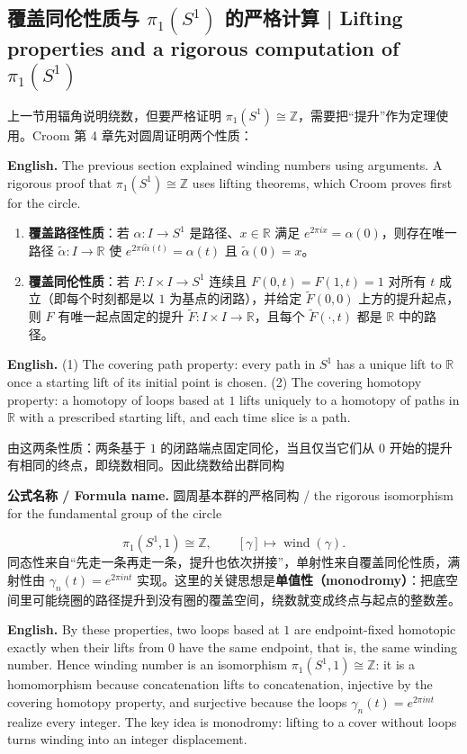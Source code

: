 \documentclass[UTF8,11pt,a4paper]{ctexart}
\newcommand{\EN}[1]{\par\noindent\textbf{English.} #1\par}
\newcommand{\FORMULA}[2]{\par\noindent\textbf{公式名称 / Formula name.} #1 / #2\par}
\begin{document}
\subsection{覆盖同伦性质与 $\pi_1(S^1)$ 的严格计算 | Lifting properties and a rigorous computation of $\pi_1(S^1)$}
\noindent 上一节用辐角说明绕数，但要严格证明 $\pi_1(S^1)\cong\mathbb Z$，需要把“提升”作为定理使用。Croom 第 4 章先对圆周证明两个性质：
\EN{The previous section explained winding numbers using arguments. A rigorous proof that $\pi_1(S^1)\cong\mathbb Z$ uses lifting theorems, which Croom proves first for the circle.}
\begin{enumerate}[label=(\arabic*)]
\item \textbf{覆盖路径性质}：若 $\alpha:I\to S^1$ 是路径、$x\in\mathbb R$ 满足 $e^{2\pi ix}=\alpha(0)$，则存在唯一路径 $\widetilde\alpha:I\to\mathbb R$ 使 $e^{2\pi i\widetilde\alpha(t)}=\alpha(t)$ 且 $\widetilde\alpha(0)=x$。
\item \textbf{覆盖同伦性质}：若 $F:I\times I\to S^1$ 连续且 $F(0,t)=F(1,t)=1$ 对所有 $t$ 成立（即每个时刻都是以 $1$ 为基点的闭路），并给定 $\widetilde F(0,0)$ 上方的提升起点，则 $F$ 有唯一起点固定的提升 $\widetilde F:I\times I\to\mathbb R$，且每个 $\widetilde F(\cdot,t)$ 都是 $\mathbb R$ 中的路径。
\end{enumerate}
\EN{(1) The covering path property: every path in $S^1$ has a unique lift to $\mathbb R$ once a starting lift of its initial point is chosen. (2) The covering homotopy property: a homotopy of loops based at $1$ lifts uniquely to a homotopy of paths in $\mathbb R$ with a prescribed starting lift, and each time slice is a path.}
\noindent 由这两条性质：两条基于 $1$ 的闭路端点固定同伦，当且仅当它们从 $0$ 开始的提升有相同的终点，即绕数相同。因此绕数给出群同构
\FORMULA{圆周基本群的严格同构}{the rigorous isomorphism for the fundamental group of the circle}
\[
\pi_1(S^1,1)\cong\mathbb Z,\qquad [\gamma]\mapsto\operatorname{wind}(\gamma).
\]
同态性来自“先走一条再走一条，提升也依次拼接”，单射性来自覆盖同伦性质，满射性由 $\gamma_n(t)=e^{2\pi int}$ 实现。这里的关键思想是\textbf{单值性（monodromy）}：把底空间里可能绕圈的路径提升到没有圈的覆盖空间，绕数就变成终点与起点的整数差。
\EN{By these properties, two loops based at $1$ are endpoint-fixed homotopic exactly when their lifts from $0$ have the same endpoint, that is, the same winding number. Hence winding number is an isomorphism $\pi_1(S^1,1)\cong\mathbb Z$: it is a homomorphism because concatenation lifts to concatenation, injective by the covering homotopy property, and surjective because the loops $\gamma_n(t)=e^{2\pi int}$ realize every integer. The key idea is monodromy: lifting to a cover without loops turns winding into an integer displacement.}
\end{document}
